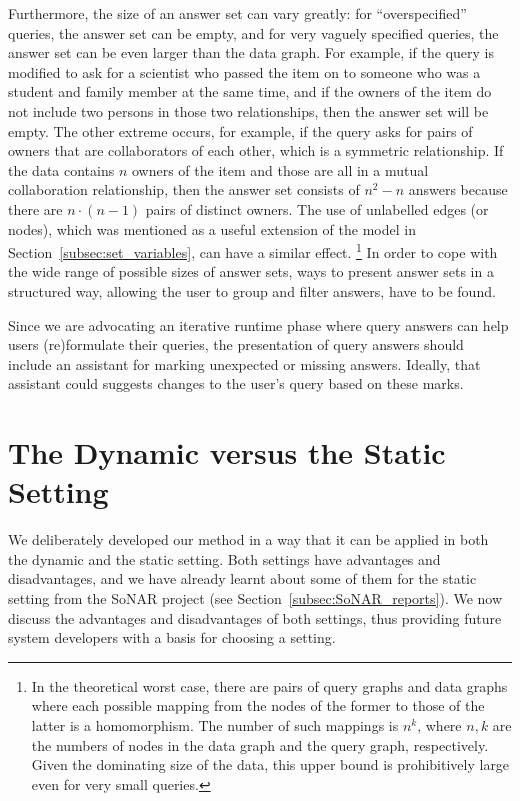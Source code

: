 Furthermore, the size of an answer set can vary greatly: for \enquote{overspecified} queries, the answer set can be empty,
and for very vaguely specified queries, the answer set can be even larger than the data graph.
For example, if the query  is modified to ask for a scientist who passed the item on
to someone who was a student and family member at the same time, and if the owners of the item
do not include two persons in those two relationships, then the answer set will be empty.
The other extreme occurs, for example, if the query asks for pairs of owners that are collaborators of each other,
which is a symmetric relationship. If the data contains $n$ owners of the item and those are all in a mutual collaboration relationship,
then the answer set consists of $n^2 - n$ answers because there are $n \cdot (n-1)$ pairs of distinct owners.
The use of unlabelled edges (or nodes), which was mentioned as a useful extension of the model in Section~\ref{subsec:set_variables},
can have a similar effect.%
\footnote{%
  In the theoretical worst case, there are pairs of query graphs and data graphs
  where each possible mapping from the nodes of the former
  to those of the latter is a homomorphism. The number of such mappings is $n^k$,
  where $n,k$ are the numbers of nodes in the data graph and the query graph, respectively.
  Given the dominating size of the data, this upper bound is prohibitively large even for very small queries.%
}
In order to cope with the wide range of possible sizes of answer sets,
ways to present answer sets in a structured way,
allowing the user to group and filter answers, have to be found.

Since we are advocating an iterative runtime phase where query answers can help users (re)for\-mu\-late their queries,
the presentation of query answers should include an assistant for marking unexpected or missing answers.
Ideally, that assistant could suggests changes to the user's query based on these marks.

\section{The Dynamic versus the Static Setting}
\label{sec:dynamic_vs_static}

We deliberately developed our method in a way that it can be applied
in both the dynamic and the static setting.
Both settings have advantages and disadvantages,
and we have already learnt about some of them for the static setting
from the SoNAR project (see Section~\ref{subsec:SoNAR_reports}).
We now discuss the advantages and disadvantages of both settings,
thus providing future system developers with a basis for choosing a setting.

